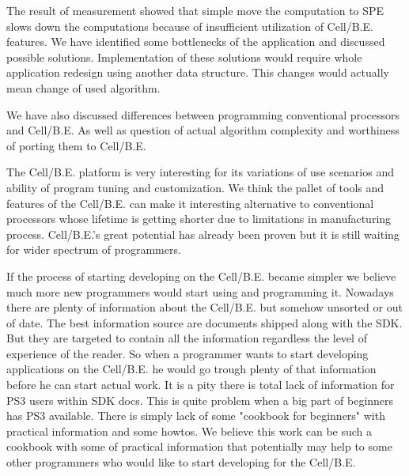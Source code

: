 \par
The result of measurement showed that simple move the computation to SPE slows down the computations because of insufficient utilization of \mbox{Cell/B.E.} features.
We have identified some bottlenecks of the application and discussed possible solutions.
Implementation of these solutions would require whole application redesign using another data structure.
This changes would actually mean change of used algorithm.

\par
We have also discussed differences between programming conventional processors and \mbox{Cell/B.E.}
As well as question of actual algorithm complexity and worthiness of porting them to \mbox{Cell/B.E.}

\par
The \mbox{Cell/B.E.} platform is very interesting for its variations of use scenarios and ability of program tuning and customization.
We think the pallet of tools and features of the \mbox{Cell/B.E.} can make it interesting alternative to conventional processors whose lifetime is getting shorter due to limitations in manufacturing process.
\mbox{Cell/B.E.}'s great potential has already been proven but it is still waiting for wider spectrum of programmers.

\par
If the process of starting developing on the \mbox{Cell/B.E.} became simpler we believe much more new programmers would start using and programming it.
Nowadays there are plenty of information about the \mbox{Cell/B.E.} but somehow unsorted or out of date.
The best information source are documents shipped along with the SDK.
But they are targeted to contain all the information regardless the level of experience of the reader.
So when a programmer wants to start developing applications on the \mbox{Cell/B.E.} he would go trough plenty of that information before he can start actual work.
It is a pity there is total lack of information for PS3 users within SDK docs.
This is quite problem when a big part of beginners has PS3 available.
There is simply lack of some "cookbook for beginners" with practical information and some howtos.
We believe this work can be such a cookbook with some of practical information that potentially may help to some other programmers who would like to start developing for the \mbox{Cell/B.E.}
